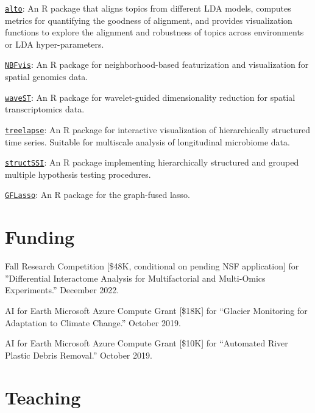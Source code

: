 \documentclass[letterpaper]{article}
\renewenvironment{itemize}{
  \begin{list}{}{
    \setlength{\leftmargin}{1.5em}
  }
}{
  \end{list}
}
\begin{document}
\begin{itemize}
\item \href{https://lasy.github.io/alto/}{\texttt{alto}}: An R package that
aligns topics from different LDA models, computes metrics for quantifying the
goodness of alignment, and provides visualization functions to explore the
alignment and robustness of topics across environments or LDA hyper-parameters.
\item \href{https://github.com/XTH1114/NBFvis}{\texttt{NBFvis}}: An R package for neighborhood-based featurization and
visualization for spatial genomics data.
\item \href{https://github.com/OliverXUZY/waveST/}{\texttt{waveST}}: An R
package for wavelet-guided dimensionality reduction for spatial transcriptomics
data.
\item \href{https://krisrs1128.github.io/treelapse/}{\texttt{treelapse}}: An R
package for interactive visualization of hierarchically structured time series.
Suitable for multiscale analysis of longitudinal microbiome data.
\item \href{https://github.com/krisrs1128/structSSI}{\texttt{structSSI}}: An R
package implementing hierarchically structured and grouped multiple hypothesis
testing procedures.
\item \href{https://github.com/krisrs1128/GFLasso}{\texttt{GFLasso}}: An R
package for the graph-fused lasso.
\end{itemize}

\section*{Funding}

\begin{itemize}
\item Fall Research Competition [\$48K, conditional on pending NSF application]
for ''Differential Interactome Analysis for Multifactorial and Multi-Omics
Experiments.'' December 2022.
\item AI for Earth Microsoft Azure Compute Grant [\$18K] for
``Glacier Monitoring for Adaptation to Climate Change.'' October 2019. \\
\item AI for Earth Microsoft Azure Compute Grant [\$10K] for
``Automated River Plastic Debris Removal.'' October 2019.
\end{itemize}

\section*{Teaching}
\end{document}
